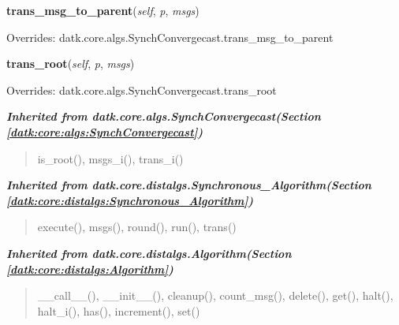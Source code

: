     \vspace{0.5ex}

\hspace{.8\funcindent}\begin{boxedminipage}{\funcwidth}

    \raggedright \textbf{trans\_msg\_to\_parent}(\textit{self}, \textit{p}, \textit{msgs})

\setlength{\parskip}{2ex}
\setlength{\parskip}{1ex}
      Overrides: datk.core.algs.SynchConvergecast.trans\_msg\_to\_parent

    \end{boxedminipage}

    \vspace{0.5ex}

\hspace{.8\funcindent}\begin{boxedminipage}{\funcwidth}

    \raggedright \textbf{trans\_root}(\textit{self}, \textit{p}, \textit{msgs})

\setlength{\parskip}{2ex}
\setlength{\parskip}{1ex}
      Overrides: datk.core.algs.SynchConvergecast.trans\_root

    \end{boxedminipage}


\large{\textbf{\textit{Inherited from datk.core.algs.SynchConvergecast\textit{(Section \ref{datk:core:algs:SynchConvergecast})}}}}

\begin{quote}
is\_root(), msgs\_i(), trans\_i()
\end{quote}

\large{\textbf{\textit{Inherited from datk.core.distalgs.Synchronous\_Algorithm\textit{(Section \ref{datk:core:distalgs:Synchronous_Algorithm})}}}}

\begin{quote}
execute(), msgs(), round(), run(), trans()
\end{quote}

\large{\textbf{\textit{Inherited from datk.core.distalgs.Algorithm\textit{(Section \ref{datk:core:distalgs:Algorithm})}}}}

\begin{quote}
\_\_call\_\_(), \_\_init\_\_(), cleanup(), count\_msg(), delete(), get(), halt(), halt\_i(), has(), increment(), set()
\end{quote}

